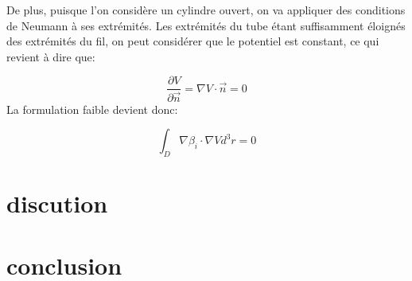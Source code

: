 \documentclass[a4paper,12pt]{article}
\begin{document}
De plus, puisque l'on considère un cylindre ouvert, on va appliquer des conditions de Neumann à ses extrémités. Les extrémités du tube étant suffisamment éloignés des extrémités du fil, on peut considérer que le potentiel est constant, ce qui revient à dire que:

\[
\frac{\partial V}{\partial \vec{n} } = \nabla V \cdot \vec{n} = 0
\]
La formulation faible devient donc:

\[
\int_{D} \nabla \beta_i \cdot \nabla V d^3 r = 0
\]

\section{discution}



\section{conclusion}
\end{document}
